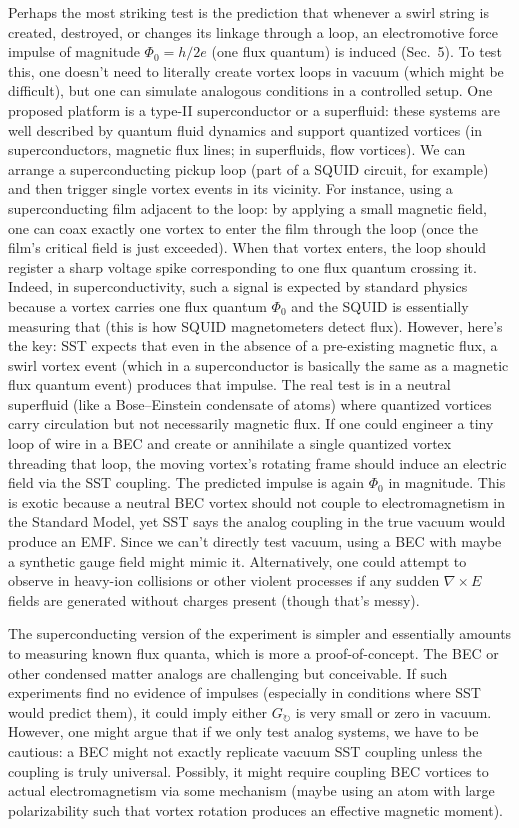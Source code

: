 \documentclass[10pt,reprint,aps,onecolumn,nofootinbib]{revtex4-2}
\begin{document}
Perhaps the most striking test is the prediction that whenever a swirl string is created, destroyed, or changes its linkage through a loop, an electromotive force impulse of magnitude $\Phi_0 = h/2e$ (one flux quantum) is induced (Sec.~5). To test this, one doesn’t need to literally create vortex loops in vacuum (which might be difficult), but one can simulate analogous conditions in a controlled setup. One proposed platform is a type-II superconductor or a superfluid: these systems are well described by quantum fluid dynamics and support quantized vortices (in superconductors, magnetic flux lines; in superfluids, flow vortices). We can arrange a superconducting pickup loop (part of a SQUID circuit, for example) and then trigger single vortex events in its vicinity. For instance, using a superconducting film adjacent to the loop: by applying a small magnetic field, one can coax exactly one vortex to enter the film through the loop (once the film’s critical field is just exceeded). When that vortex enters, the loop should register a sharp voltage spike corresponding to one flux quantum crossing it. Indeed, in superconductivity, such a signal is expected by standard physics because a vortex carries one flux quantum $\Phi_0$ and the SQUID is essentially measuring that (this is how SQUID magnetometers detect flux). However, here’s the key: SST expects that even in the absence of a pre-existing magnetic flux, a swirl vortex event (which in a superconductor is basically the same as a magnetic flux quantum event) produces that impulse. The real test is in a neutral superfluid (like a Bose–Einstein condensate of atoms) where quantized vortices carry circulation but not necessarily magnetic flux. If one could engineer a tiny loop of wire in a BEC and create or annihilate a single quantized vortex threading that loop, the moving vortex’s rotating frame should induce an electric field via the SST coupling. The predicted impulse is again $\Phi_0$ in magnitude. This is exotic because a neutral BEC vortex should not couple to electromagnetism in the Standard Model, yet SST says the analog coupling in the true vacuum would produce an EMF. Since we can’t directly test vacuum, using a BEC with maybe a synthetic gauge field might mimic it. Alternatively, one could attempt to observe in heavy-ion collisions or other violent processes if any sudden $\nabla \times E$ fields are generated without charges present (though that’s messy).


The superconducting version of the experiment is simpler and essentially amounts to measuring known flux quanta, which is more a proof-of-concept. The BEC or other condensed matter analogs are challenging but conceivable. If such experiments find no evidence of impulses (especially in conditions where SST would predict them), it could imply either $G_{\circlearrowright}$ is very small or zero in vacuum. However, one might argue that if we only test analog systems, we have to be cautious: a BEC might not exactly replicate vacuum SST coupling unless the coupling is truly universal. Possibly, it might require coupling BEC vortices to actual electromagnetism via some mechanism (maybe using an atom with large polarizability such that vortex rotation produces an effective magnetic moment).
\end{document}
